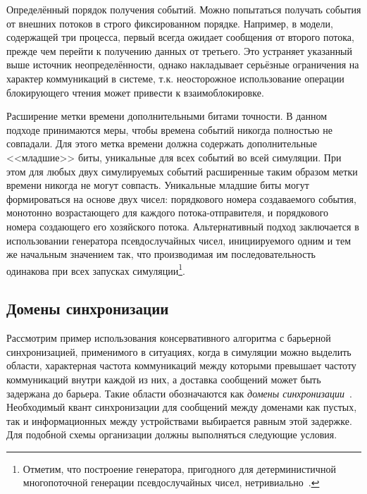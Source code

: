 \begin{description*}
    \item[Определённый порядок получения событий.] Можно попытаться получать события от внешних потоков в строго фиксированном порядке. Например, в модели, содержащей три процесса, первый всегда ожидает сообщения от второго потока, прежде чем перейти к получению данных от третьего. Это устраняет указанный выше источник неопределённости, однако накладывает серьёзные ограничения на характер коммуникаций в системе, т.к. неосторожное использование операции блокирующего чтения может привести к взаимоблокировке.
    \item[Расширение метки времени дополнительными битами точности.] В данном подходе принимаются меры, чтобы времена событий никогда полностью не совпадали. Для этого метка времени должна содержать дополнительные <<младшие>> биты, уникальные для всех событий во всей симуляции. При этом для любых двух симулируемых событий расширенные таким образом метки времени никогда не могут совпасть. Уникальные младшие биты могут формироваться на основе двух чисел: порядкового номера создаваемого события, монотонно возрастающего для каждого потока-отправителя, и порядкового номера создающего его хозяйского потока. Альтернативный подход заключается в использовании генератора псевдослучайных чисел, инициируемого одним и тем же начальным значением так, что производимая им последовательность одинакова при всех запусках симуляции\footnote{Отметим, что построение генератора, пригодного для детерминистичной многопоточной генерации псевдослучайных чисел, нетривиально~\cite{dotmix}.}.
\end{description*}


\subsection{Домены синхронизации}

Рассмотрим пример использования консервативного алгоритма с барьерной синхронизацией, применимого в ситуациях, когда в симуляции  можно выделить области, характерная частота коммуникаций между которыми превышает частоту коммуникаций внутри каждой из них, а доставка сообщений может быть задержана до барьера. Такие области обозначаются как \textit{домены синхронизации}~\cite{simics-accelerator-guide}. Необходимый квант синхронизации для сообщений между доменами как пустых, так и информационных между устройствами выбирается равным этой задержке. Для подобной схемы организации должны выполняться следующие условия.

